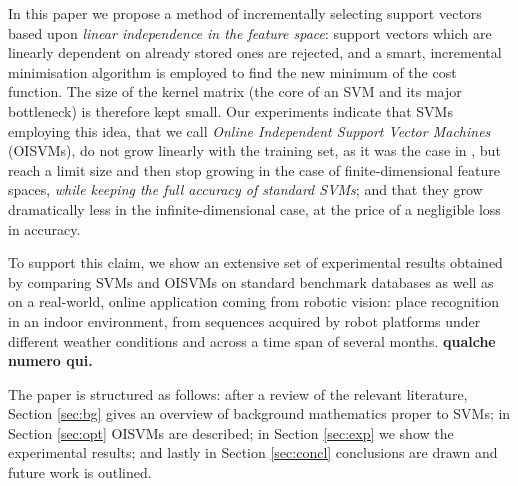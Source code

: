 In this paper we propose a method of incrementally selecting support
vectors based upon \emph{linear independence in the feature space}:
support vectors which are linearly dependent on already stored ones
are rejected, and a smart, incremental minimisation algorithm is
employed to find the new minimum of the cost function. The size of the
kernel matrix (the core of an SVM and its major bottleneck) is
therefore kept small. Our experiments indicate that SVMs employing
this idea, that we call \emph{Online Independent Support Vector
Machines} (OISVMs), do not grow linearly with the training set, as it
was the case in \cite{Steinwart03}, but reach a limit size and then
stop growing in the case of finite-dimensional feature spaces,
\emph{while keeping the full accuracy of standard SVMs}; and that they
grow dramatically less in the infinite-dimensional case, at the price
of a negligible loss in accuracy.

To support this claim, we show an extensive set of experimental
results obtained by comparing SVMs and OISVMs on standard benchmark
databases as well as on a real-world, online application coming from
robotic vision: place recognition in an indoor environment, from
sequences acquired by robot platforms under different weather
conditions and across a time span of several months.
{\bf qualche numero qui.}

The paper is structured as follows: after a review of the relevant
literature, Section \ref{sec:bg} gives an overview of background
mathematics proper to SVMs; in Section \ref{sec:opt} OISVMs are
described; in Section \ref{sec:exp} we show the experimental results;
and lastly in Section \ref{sec:concl} conclusions are drawn and future
work is outlined.
